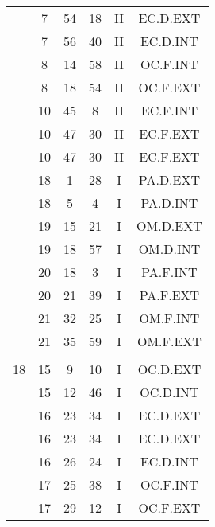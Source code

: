 \documentclass[12pt, a4paper]{article}
\begin{document}
\begin{multicols}{3}
{\begin{tabular}{c c c c c c}
	 	 	 	 & 7 & 54 & 18 & II & EC.D.EXT\\%
	 	 	 	 & 7 & 56 & 40 & II & EC.D.INT\\%
	 	 	 	 & 8 & 14 & 58 & II & OC.F.INT\\%
	 	 	 	 & 8 & 18 & 54 & II & OC.F.EXT\\%
	 	 	 	 & 10 & 45 & 8 & II & EC.F.INT\\%
	 	 	 	 & 10 & 47 & 30 & II & EC.F.EXT\\%
	 	 	 	 & 10 & 47 & 30 & II & EC.F.EXT\\%
	 	 	 	 & 18 & 1 & 28 & I & PA.D.EXT\\%
	 	 	 	 & 18 & 5 & 4 & I & PA.D.INT\\%
	 	 	 	 & 19 & 15 & 21 & I & OM.D.EXT\\%
	 	 	 	 & 19 & 18 & 57 & I & OM.D.INT\\%
	 	 	 	 & 20 & 18 & 3 & I & PA.F.INT\\%
	 	 	 	 & 20 & 21 & 39 & I & PA.F.EXT\\%
	 	 	 	 & 21 & 32 & 25 & I & OM.F.INT\\%
	 	 	 	 & 21 & 35 & 59 & I & OM.F.EXT\\%
	 	 	 	 & & & & & \\%
	 	 	 	18 & 15 & 9 & 10 & I & OC.D.EXT\\%
	 	 	 	 & 15 & 12 & 46 & I & OC.D.INT\\%
	 	 	 	 & 16 & 23 & 34 & I & EC.D.EXT\\%
	 	 	 	 & 16 & 23 & 34 & I & EC.D.EXT\\%
	 	 	 	 & 16 & 26 & 24 & I & EC.D.INT\\%
	 	 	 	 & 17 & 25 & 38 & I & OC.F.INT\\%
	 	 	 	 & 17 & 29 & 12 & I & OC.F.EXT\\%

\end{tabular}}
\end{multicols}
\end{document}
